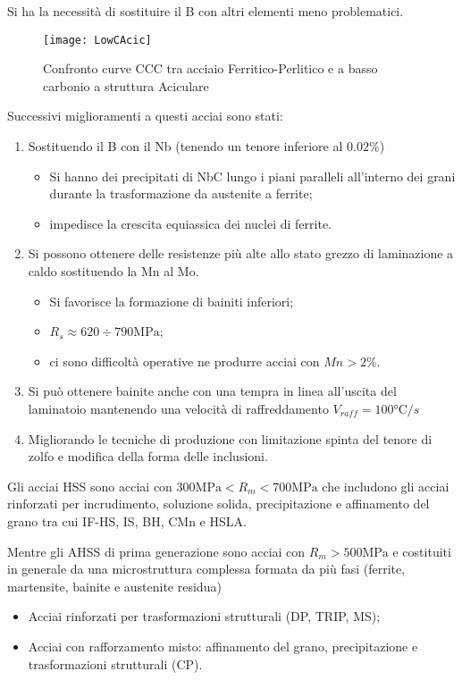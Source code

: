 Si ha la necessità di sostituire il B con altri elementi meno problematici.

\begin{figure}
\centering
\texttt{[image: LowCAcic]}
\caption{Confronto curve CCC tra acciaio Ferritico-Perlitico e a basso carbonio a struttura Aciculare}
\label{fig:ConfFer-Per/LowC}
\end{figure}

Successivi miglioramenti a questi acciai sono stati:
\begin{enumerate}
\item Sostituendo il B con il Nb (tenendo un tenore inferiore al $0.02\%$)
	\begin{itemize}
	\item Si hanno dei precipitati di NbC lungo i piani paralleli all'interno dei grani
	durante la trasformazione da austenite a ferrite;
	\item impedisce la crescita equiassica dei nuclei di ferrite. 
	\end{itemize}
\item Si possono ottenere delle resistenze più alte allo stato grezzo di laminazione a caldo 
sostituendo la Mn al Mo.
	\begin{itemize}
	\item Si favorisce la formazione di bainiti inferiori;
	\item $R_s \approx 620 \div 790\unit{\MPa}$;
	\item ci sono difficoltà operative ne produrre acciai con $Mn > 2\%$.
	\end{itemize}
\item Si può ottenere bainite anche con una tempra in linea all'uscita del laminatoio
mantenendo una velocità di raffreddamento $V_{raff} = 100\unit{\celsius/s}$
\item Migliorando le tecniche di produzione con limitazione spinta del tenore di zolfo e
modifica della forma delle inclusioni.
\end{enumerate}

Gli acciai \ac{HSS} sono acciai con $300\unit{\MPa} < R_m < 700\unit{\MPa}$ che includono gli
acciai rinforzati per incrudimento, soluzione solida, precipitazione e affinamento del grano
tra cui \ac{IF-HS}, \ac{IS}, \ac{BH}, \ac{CMn} e \ac{HSLA}.

Mentre gli \ac{AHSS} di prima generazione sono acciai con $R_m > 500\unit{\MPa}$ e costituiti in 
generale da una microstruttura complessa formata da più fasi (ferrite, martensite, bainite
e austenite residua) 
\begin{itemize}
\item Acciai rinforzati per trasformazioni strutturali (\ac{DP}, \ac{TRIP}, \ac{MS});
\item Acciai con rafforzamento misto: affinamento del grano, precipitazione e trasformazioni 
strutturali (\ac{CP}).
\end{itemize}

